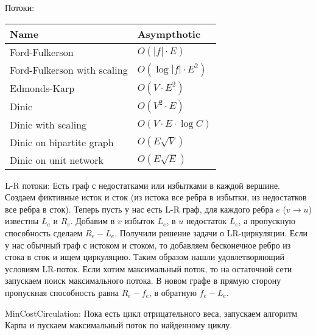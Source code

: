 Потоки:
\begin{table}[H]
\centering
\begin{tabular}{|l|l|}
	\hline
	Name                        & Asympthotic                 \\ \hline
	Ford-Fulkerson              & $O(|f| \cdot E)$            \\ \hline
	Ford-Fulkerson with scaling & $O(\log |f| \cdot E^2)$     \\ \hline
	Edmonds-Karp                & $O(V \cdot E^2)$            \\ \hline
	Dinic                       & $O(V^2\cdot E)$             \\ \hline
	Dinic with scaling          & $O(V \cdot E \cdot \log C)$ \\ \hline
	Dinic on bipartite graph    & $O(E \sqrt{V})$             \\ \hline
	Dinic on unit network       & $O(E \sqrt{E})$             \\ \hline
\end{tabular}
\end{table}

L-R потоки:
Есть граф с недостатками или избытками в каждой вершине. Создаем фиктивные исток и сток (из истока все ребра в избытки, из недостатков все ребра в сток).
Теперь пусть у нас есть L-R граф, для каждого ребра $e$ ($v \rightarrow u$) известны $L_e$ и $R_e$. Добавим в $v$ избыток $L_e$, в $u$ недостаток $L_e$, 
а пропускную способность сделаем $R_e - L_e$.
Получили решение задачи о LR-циркуляции.
Если у нас обычный граф с истоком и стоком, то добавляем бесконечное ребро из стока в сток и ищем циркуляцию.
Таким образом нашли удовлетворяющий условиям LR-поток. Если хотим максимальный поток, то на остаточной сети запускаем поиск максимального потока.
В новом графе в прямую сторону пропускная способность равна $R_e - f_e$, в обратную $f_e - L_e$.

MinCostCirculation:
Пока есть цикл отрицательного веса, запускаем алгоритм Карпа и пускаем максимальный поток по найденному циклу.

